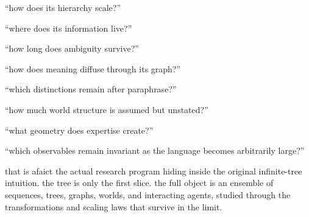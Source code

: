 “how does its hierarchy scale?”

“where does its information live?”

“how long does ambiguity survive?”

“how does meaning diffuse through its graph?”

“which distinctions remain after paraphrase?”

“how much world structure is assumed but unstated?”

“what geometry does expertise create?”

“which observables remain invariant as the language becomes arbitrarily large?”

that is afaict the actual research program hiding inside the original infinite-tree intuition. the tree is only the first slice. the full object is an ensemble of sequences, trees, graphs, worlds, and interacting agents, studied through the transformations and scaling laws that survive in the limit.
